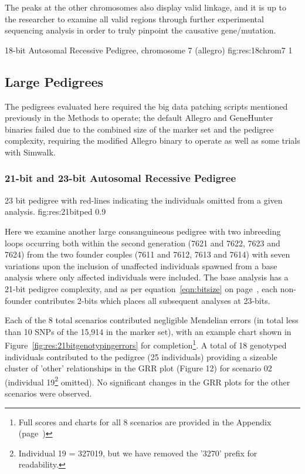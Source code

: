The peaks at the other chromosomes also display valid linkage, and it is up to the researcher to examine all valid regions through further experimental sequencing analysis in order to truly pinpoint the causative gene/mutation.

	{18-bit Autosomal Recessive Pedigree, chromosome 7 (allegro)}
	{fig:res:18chrom7}
	{1}{}


\subsection{Large Pedigrees}

The pedigrees evaluated here required the big data patching scripts mentioned previously in the Methods to operate; the default Allegro and GeneHunter binaries failed due to the combined size of the marker set and the pedigree complexity, requiring the modified Allegro binary to operate as well as some trials with Simwalk.

\subsubsection*{21-bit and 23-bit Autosomal Recessive Pedigree}

	{23 bit pedigree with red-lines indicating the individuals omitted from a given analysis.}
	{fig:res:21bitped}
	{0.9}{}

Here we examine another large consanguineous pedigree with two inbreeding loops occurring both within the second generation (7621 and 7622, 7623 and 7624) from the two founder couples (7611 and 7612, 7613 and 7614) with seven variations upon the inclusion of unaffected individuals spawned from a base analysis where only affected individuals were included. The base analysis has a 21-bit pedigree complexity, and as per equation~\ref{eqn:bitsize} on page~\pageref{eqn:bitsize}, each non-founder contributes 2-bits which places all subsequent analyses at 23-bits.

Each of the 8 total scenarios contributed negligible Mendelian errors (in total less than 10 SNPs of the 15,914 in the marker set), with an example chart shown in Figure~\ref{fig:res:21bitgenotypingerrors} for completion\footnote{ \label{footnote:scores} Full scores and charts for all 8 scenarios are provided in the Appendix (page~\pageref{ref:app:21bitscores})}. A total of 18 genotyped individuals contributed to the pedigree (25 individuals) providing a sizeable cluster of 'other' relationships in the GRR plot (Figure 12) for scenario 02 (individual 19\footnote{Individual 19 = 327019, but we have removed the '3270' prefix for readability.} omitted). No significant changes in the GRR plots for the other scenarios were observed.

